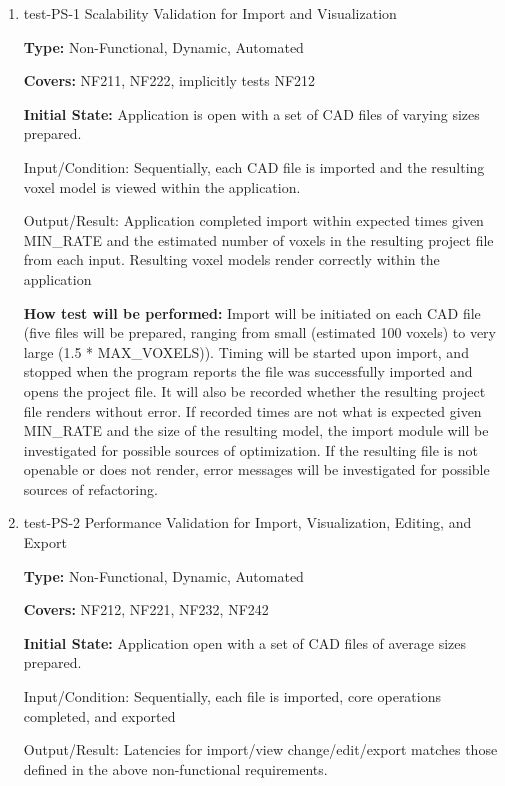 \documentclass[12pt, titlepage]{article}
\begin{document}
\begin{enumerate}

\item{test-PS-1 Scalability Validation for Import and Visualization\\}
\label{sec:t-nf-7}

\textbf{Type:} Non-Functional, Dynamic, Automated

\textbf{Covers:} NF211, NF222, implicitly tests NF212
					
\textbf{Initial State:} Application is open with a set of CAD files of varying sizes prepared.
					
Input/Condition: Sequentially, each CAD file is imported and the resulting voxel model is viewed within the application. 
					
Output/Result: Application completed import within expected times given MIN\_RATE and the estimated number of voxels in the resulting project
file from each input. Resulting voxel models render correctly within the application
					
\textbf{How test will be performed:} Import will be initiated on each CAD file (five files will be prepared, ranging from small (estimated 
100 voxels) to very large (1.5 * MAX\_VOXELS)). Timing will be started upon import, and stopped when the program reports the file was 
successfully imported and opens the project file. It will also be recorded whether the resulting project file renders without error.
If recorded times are not what is expected given MIN\_RATE and the size of the
resulting model, the import module will be investigated for possible sources of optimization. If the resulting file is not openable or does
not render, error messages will be investigated for possible sources of refactoring. %
					
\item{test-PS-2 Performance Validation for Import, Visualization, Editing, and Export\\}
\label{sec:t-nf-8}

\textbf{Type:} Non-Functional, Dynamic, Automated

\textbf{Covers:} NF212, NF221, NF232, NF242
					
\textbf{Initial State:} Application open with a set of CAD files of average sizes prepared.
					
Input/Condition: Sequentially, each file is imported, core operations completed, and exported
					
Output/Result: Latencies for import/view change/edit/export matches those defined in the above non-functional requirements.
					

\end{enumerate}
\end{document}
